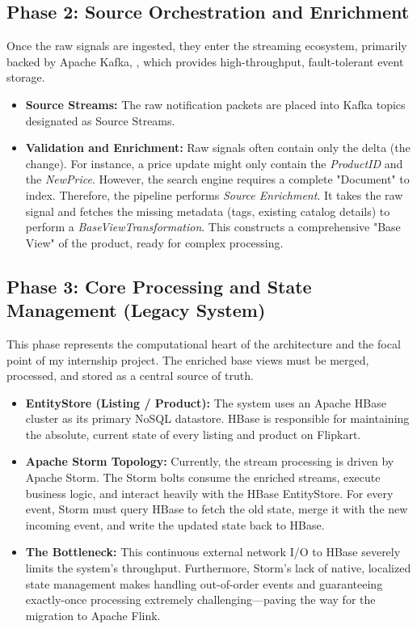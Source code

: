 \subsection{Phase 2: Source Orchestration and Enrichment}
\begin{justify}
    Once the raw signals are ingested, they enter the streaming ecosystem, primarily backed by Apache Kafka, , which provides high-throughput, fault-tolerant event storage.
    
    \begin{itemize}
        \item \textbf{Source Streams:} The raw notification packets are placed into Kafka topics designated as Source Streams. 
        \item \textbf{Validation and Enrichment:} Raw signals often contain only the delta (the change). For instance, a price update might only contain the \textit{ProductID} and the \textit{NewPrice}. However, the search engine requires a complete "Document" to index. Therefore, the pipeline performs \textit{Source Enrichment}. It takes the raw signal and fetches the missing metadata (tags, existing catalog details) to perform a \textit{BaseViewTransformation}. This constructs a comprehensive "Base View" of the product, ready for complex processing.
    \end{itemize}
\end{justify}

\subsection{Phase 3: Core Processing and State Management (Legacy System)}
\begin{justify}
    This phase represents the computational heart of the architecture and the focal point of my internship project. The enriched base views must be merged, processed, and stored as a central source of truth.
    
    \begin{itemize}
        \item \textbf{EntityStore (Listing / Product):} The system uses an Apache HBase cluster as its primary NoSQL datastore. HBase is responsible for maintaining the absolute, current state of every listing and product on Flipkart.
        \item \textbf{Apache Storm Topology:}  Currently, the stream processing is driven by Apache Storm. The Storm bolts consume the enriched streams, execute business logic, and interact heavily with the HBase EntityStore. For every event, Storm must query HBase to fetch the old state, merge it with the new incoming event, and write the updated state back to HBase. 
        \item \textbf{The Bottleneck:} This continuous external network I/O to HBase severely limits the system's throughput. Furthermore, Storm's lack of native, localized state management makes handling out-of-order events and guaranteeing exactly-once processing extremely challenging—paving the way for the migration to Apache Flink.
    \end{itemize}
\end{justify}

